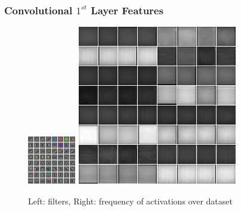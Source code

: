 \documentclass{beamer}
\begin{document}
\begin{frame}
\frametitle{Convolutional $1^{st}$ Layer Features}
\begin{center} 
\begin{figure} 
\includegraphics[scale=1.5]{./Figures/Project1/filters_slow.png} \hspace{0.5cm} 
\includegraphics[scale=0.45]{./Figures/Project1/act_large_slow.png}
\caption{Left: filters, Right: frequency of activations over dataset}
\end{figure} 
\end{center} 
\end{frame} 
\end{document}
